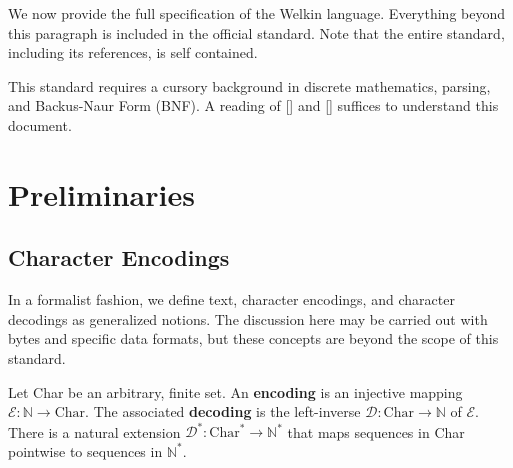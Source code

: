 

We now provide the full specification of the Welkin language. Everything beyond this paragraph is included in the official standard. Note that the entire standard, including its references, is self contained.


This standard requires a cursory background in discrete mathematics, parsing, and Backus-Naur Form (BNF). A reading of [] and [] suffices to understand this document.

\section{Preliminaries}

\newcommand*{\chars}{\mathrm{CHAR}}
\newcommand*{\numbers}{\mathrm{NUMBER}}
\newcommand*{\whitespaces}{\mathrm{WHITE\_SPACES}}
\newcommand*{\reserved}{\mathrm{RESERVED}}
\newcommand*{\strings}{\mathrm{STRING}}
\newcommand*{\term}{\mathrm{term}}
\newcommand*{\terms}{\mathrm{terms}}
\newcommand*{\delimiters}{\mathrm{DELIMITERS}}
\newcommand*{\encoding}{\mathcal{E}}
\newcommand*{\decoding}{\mathcal{D}}

\newcommand*{\scope}{\textrm{scope}}

\subsection{Character Encodings}
In a formalist fashion, we define text, character encodings, and character decodings as generalized notions. The discussion here may be carried out with bytes and specific data formats, but these concepts are beyond the scope of this standard.

Let Char be an arbitrary, finite set. An \textbf{encoding} is an injective mapping $\encoding : \mathbb{N} \to \textrm{Char}.$ The associated \textbf{decoding} is the left-inverse $\decoding: \mathrm{Char} \to \mathbb{N}$ of $\encoding.$ There is a natural extension $\decoding^{*}: \textrm{Char}^{*} \to \mathbb{N}^{*}$
that maps sequences in Char pointwise to sequences in $\mathbb{N}^{*}.$

